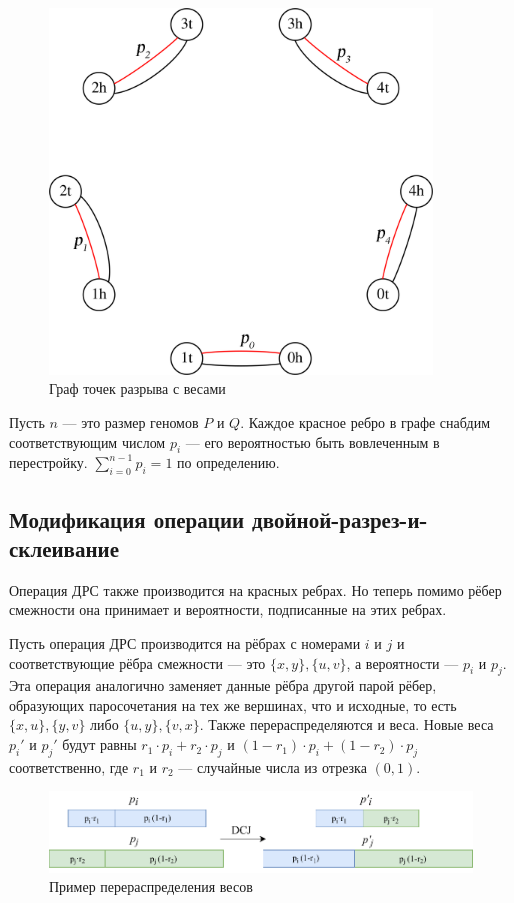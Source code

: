 \begin{figure}[h!]
    \includegraphics[width=4in]{img/bpg0-eps-converted-to.png}
    \caption{Граф точек разрыва с весами}
\end{figure}

Пусть $n$ --- это размер геномов $P$ и $Q$.
Каждое красное ребро в графе снабдим соответствующим числом $p_i$ --- его вероятностью быть вовлеченным в перестройку.
$\sum_{i=0}^{n-1} {p_i} = 1$ по определению.

\subsection{Модификация операции двойной-разрез-и-склеивание}
Операция ДРС также производится на красных ребрах.
Но теперь помимо рёбер смежности она принимает и вероятности, подписанные на этих ребрах.

Пусть операция ДРС производится на рёбрах с номерами $i$ и $j$ и соответствующие рёбра смежности --- это $\{x, y\}, \{u, v\}$, а вероятности --- $p_i$ и $p_j$.
Эта операция аналогично заменяет данные рёбра другой парой рёбер, образующих паросочетания на тех же вершинах, что и исходные, то есть $\{x, u\}, \{y, v\}$ либо $\{u, y\} , \{v, x\}$.
Также перераспределяются и веса.
Новые веса $p_i'$ и $p_j'$ будут равны $r_1 \cdot p_i + r_2 \cdot p_j$ и $(1 - r_1) \cdot p_i + (1 - r_2) \cdot p_j$ соответственно, где $r_1$ и $r_2$ --- случайные числа из отрезка $(0, 1)$.

\begin{figure}[h!]
    \includegraphics[width=\linewidth]{img/weights-redistribution.pdf}
    \caption{Пример перераспределения весов}
    \label{weights-redistribution}
\end{figure}

